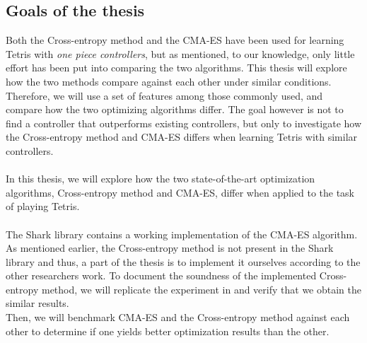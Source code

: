\subsection{Goals of the thesis}

Both the Cross-entropy method and the CMA-ES have been used 
for learning Tetris with \textit{one piece controllers}, but as 
mentioned, to our knowledge, only little effort has been put into 
comparing the two algorithms. This thesis will explore
how the two methods compare against each other under similar
conditions. Therefore, we will use a set of features among those
commonly used, and compare how the two optimizing algorithms 
differ. The goal however is not to find a controller that 
outperforms existing controllers, but only to investigate 
how the Cross-entropy method and CMA-ES differs when learning Tetris
with similar controllers.\\
\\
In this thesis, we will explore how the two state-of-the-art
optimization algorithms, Cross-entropy method and CMA-ES, differ when 
applied to the task of playing Tetris.\\
\\
The Shark library \citep{shark08} contains a
working implementation of the CMA-ES 
algorithm. As mentioned earlier, the Cross-entropy method 
is not present in the Shark library and thus, 
a part of the thesis is to implement it ourselves according to 
the other researchers work. To document the 
soundness of the implemented Cross-entropy method, 
we will replicate the experiment in \citep{thiery:09} and 
verify that we obtain the similar results.\\
Then, we will benchmark CMA-ES and the Cross-entropy method against each other 
to determine if one yields better optimization results than the other.
